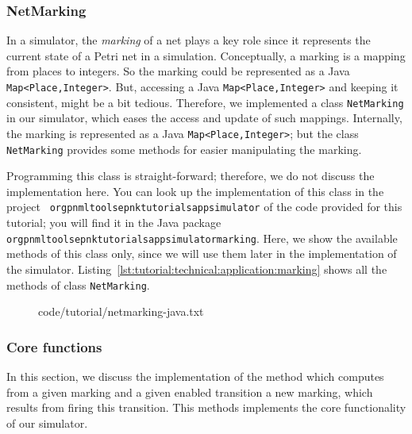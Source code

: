 \subsubsection{NetMarking}
\label{subsubsec:tutorial:technical:application:marking}

In a simulator, the \emph{marking} of a net plays a key role since it
represents the current state of a Petri net in a simulation. Conceptually, a marking is
a mapping from places to integers. So the marking could be represented as
a Java \lstinline|Map<Place,Integer>|. But, accessing a Java
\lstinline|Map<Place,Integer>| and keeping it consistent, might be a bit
tedious. Therefore, we implemented a class {\tt NetMarking} in our simulator,
which eases the access and update of such mappings. Internally, the marking is
represented as a Java \lstinline|Map<Place,Integer>|; but the class {\tt
NetMarking} provides some methods for easier manipulating the marking.

Programming this class is straight-forward; therefore, we do not discuss the
implementation here. You can look up the implementation of this class
in the project
{\tt
org\qnsep{}pnml\qnsep{}tools\qnsep{}epnk\qnsep{}tutorials\qnsep{}app\qnsep{}simulator}
of the code provided for this tutorial; you will find it in the Java package 
{\tt
org\qnsep{}pnml\qnsep{}tools\qnsep{}epnk\qnsep{}tutorials\qnsep{}app\qnsep{}simulator\qnsep{}marking}.
Here, we show the available methods of this class only, since we will use them
later in the implementation of the simulator.
Listing~\ref{lst:tutorial:technical:application:marking} shows all the methods
of class {\tt NetMarking}.

\begin{figure}[htbp!]
%
  {code/tutorial/netmarking-java.txt}
\end{figure}

\subsubsection{Core functions}
\label{subsubsec:tutorial:technical:application:corefunctions}

In this section, we discuss the implementation of the method which computes from
a given marking and a given enabled transition a new marking, which results from
firing this transition. This methods implements the core
functionality of our simulator.

